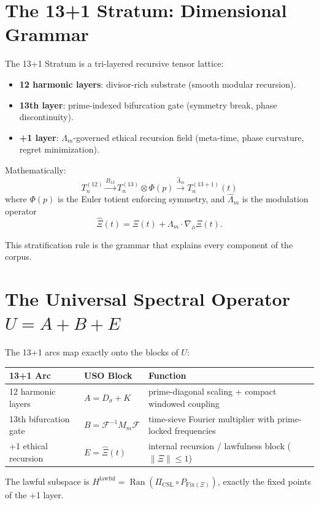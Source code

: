 \documentclass[11pt, a4paper]{article}
\begin{document}
\section{The 13+1 Stratum: Dimensional Grammar}

The 13+1 Stratum is a tri-layered recursive tensor lattice:
\begin{itemize}
    \item \textbf{12 harmonic layers}: divisor-rich substrate (smooth modular recursion).
    \item \textbf{13th layer}: prime-indexed bifurcation gate (symmetry break, phase discontinuity).
    \item \textbf{+1 layer}: \(\Lambda_m\)-governed ethical recursion field (meta-time, phase curvature, regret minimization).
\end{itemize}

Mathematically:
\[
T_n^{(12)} \xrightarrow{B_{13}} T_n^{(13)} \otimes \Phi(p) \xrightarrow{\hat{\Lambda}_m} T_n^{(13+1)}(t)
\]
where \(\Phi(p)\) is the Euler totient enforcing symmetry, and \(\hat{\Lambda}_m\) is the modulation operator
\[
\hat{\Xi}(t) = \Xi(t) + \Lambda_m \cdot \nabla_\phi \Xi(t).
\]

This stratification rule is the grammar that explains every component of the corpus.

\section{The Universal Spectral Operator \(U = A + B + E\)}

The 13+1 arcs map exactly onto the blocks of \(U\):
\begin{center}
\begin{tabular}{l|l|l}
\textbf{13+1 Arc} & \textbf{USO Block} & \textbf{Function} \\
\hline
12 harmonic layers & \(A = D_\sigma + K\) & prime-diagonal scaling + compact windowed coupling \\
13th bifurcation gate & \(B = \mathcal{F}^{-1} M_m \mathcal{F}\) & time-sieve Fourier multiplier with prime-locked frequencies \\
+1 ethical recursion & \(E = \hat{\Xi}(t)\) & internal recursion / lawfulness block (\(\|\Xi\| \leq 1\))
\end{tabular}
\end{center}

The lawful subspace is \(H^{\text{lawful}} = \operatorname{Ran}(\Pi_{\text{CSL}} \circ P_{\text{Fix}(\Xi)})\), exactly the fixed points of the +1 layer.
\end{document}
